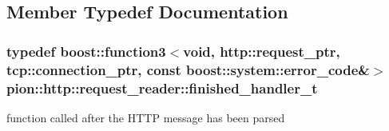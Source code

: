 \subsection{Member Typedef Documentation}
\hypertarget{classpion_1_1http_1_1request__reader_a4cc323f3e852134f2ac785e51e1d623e}{
\subsubsection[{finished\-\_\-handler\-\_\-t}]{\setlength{\rightskip}{0pt plus 5cm}typedef boost\-::function3$<$void, {\bf http\-::request\-\_\-ptr}, {\bf tcp\-::connection\-\_\-ptr}, const boost\-::system\-::error\-\_\-code\&$>$ {\bf pion\-::http\-::request\-\_\-reader\-::finished\-\_\-handler\-\_\-t}}}\label{classpion_1_1http_1_1request__reader_a4cc323f3e852134f2ac785e51e1d623e}


function called after the H\-T\-T\-P message has been parsed 



